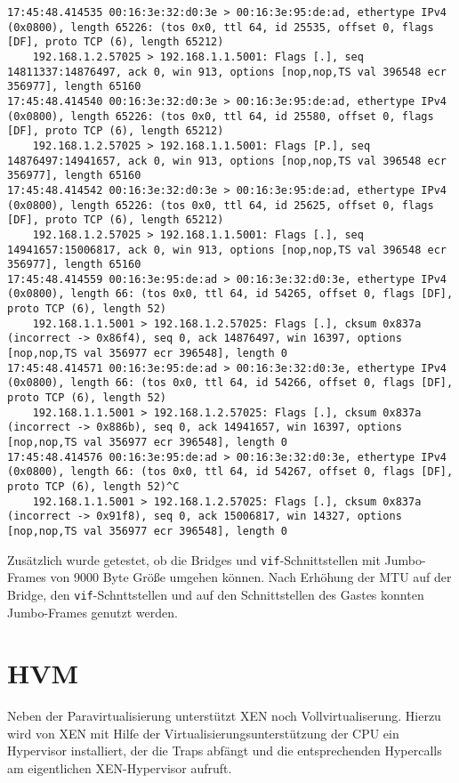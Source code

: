 \begin{verbatim}
17:45:48.414535 00:16:3e:32:d0:3e > 00:16:3e:95:de:ad, ethertype IPv4 (0x0800), length 65226: (tos 0x0, ttl 64, id 25535, offset 0, flags [DF], proto TCP (6), length 65212)
    192.168.1.2.57025 > 192.168.1.1.5001: Flags [.], seq 14811337:14876497, ack 0, win 913, options [nop,nop,TS val 396548 ecr 356977], length 65160
17:45:48.414540 00:16:3e:32:d0:3e > 00:16:3e:95:de:ad, ethertype IPv4 (0x0800), length 65226: (tos 0x0, ttl 64, id 25580, offset 0, flags [DF], proto TCP (6), length 65212)
    192.168.1.2.57025 > 192.168.1.1.5001: Flags [P.], seq 14876497:14941657, ack 0, win 913, options [nop,nop,TS val 396548 ecr 356977], length 65160
17:45:48.414542 00:16:3e:32:d0:3e > 00:16:3e:95:de:ad, ethertype IPv4 (0x0800), length 65226: (tos 0x0, ttl 64, id 25625, offset 0, flags [DF], proto TCP (6), length 65212)
    192.168.1.2.57025 > 192.168.1.1.5001: Flags [.], seq 14941657:15006817, ack 0, win 913, options [nop,nop,TS val 396548 ecr 356977], length 65160
17:45:48.414559 00:16:3e:95:de:ad > 00:16:3e:32:d0:3e, ethertype IPv4 (0x0800), length 66: (tos 0x0, ttl 64, id 54265, offset 0, flags [DF], proto TCP (6), length 52)
    192.168.1.1.5001 > 192.168.1.2.57025: Flags [.], cksum 0x837a (incorrect -> 0x86f4), seq 0, ack 14876497, win 16397, options [nop,nop,TS val 356977 ecr 396548], length 0
17:45:48.414571 00:16:3e:95:de:ad > 00:16:3e:32:d0:3e, ethertype IPv4 (0x0800), length 66: (tos 0x0, ttl 64, id 54266, offset 0, flags [DF], proto TCP (6), length 52)
    192.168.1.1.5001 > 192.168.1.2.57025: Flags [.], cksum 0x837a (incorrect -> 0x886b), seq 0, ack 14941657, win 16397, options [nop,nop,TS val 356977 ecr 396548], length 0
17:45:48.414576 00:16:3e:95:de:ad > 00:16:3e:32:d0:3e, ethertype IPv4 (0x0800), length 66: (tos 0x0, ttl 64, id 54267, offset 0, flags [DF], proto TCP (6), length 52)^C
    192.168.1.1.5001 > 192.168.1.2.57025: Flags [.], cksum 0x837a (incorrect -> 0x91f8), seq 0, ack 15006817, win 14327, options [nop,nop,TS val 356977 ecr 396548], length 0
\end{verbatim}
Zusätzlich wurde getestet, ob die Bridges und \verb#vif#-Schnittstellen mit Jumbo-Frames von 9000 Byte Größe umgehen können. Nach Erhöhung der MTU auf der Bridge, den \verb#vif#-Schnttstellen und auf den Schnittstellen des Gastes konnten Jumbo-Frames genutzt werden.

\section{HVM}
\label{hvm_vm}
Neben der Paravirtualisierung unterstützt XEN noch Vollvirtualiserung. Hierzu wird von XEN mit Hilfe der Virtualisierungsunterstützung der CPU ein Hypervisor installiert, der die Traps abfängt und die entsprechenden Hypercalls am eigentlichen XEN-Hypervisor aufruft.

